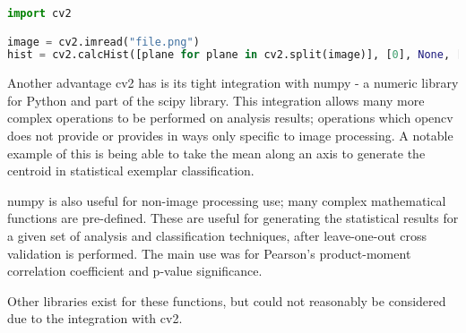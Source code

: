 \begin{lstlisting}[language=python, caption={Creating a Histogram in OpenCV cv2},
label=lst:cv2-hist, breaklines=true, frame=single]
import cv2

image = cv2.imread("file.png")
hist = cv2.calcHist([plane for plane in cv2.split(image)], [0], None, [255,255,255], [0,255,0,255,0,255])
\end{lstlisting}

Another advantage \gls{cv2} has is its tight integration with numpy - a numeric library for Python
and part of the scipy library. This integration allows many more complex operations to be 
performed on analysis results; operations which \gls{opencv} does not provide or provides in ways
only specific to image processing. A notable example of this is being able to take the mean along
an axis to generate the centroid in statistical exemplar classification.

numpy is also useful for non-image processing use; many complex mathematical functions are 
pre-defined. These are useful for generating the statistical results for a given set of analysis
and classification techniques, after leave-one-out cross validation is performed. The main use was
for Pearson's product-moment correlation coefficient and p-value significance.

Other libraries exist for these functions, but could not reasonably be considered due to the 
integration with \gls{cv2}.
